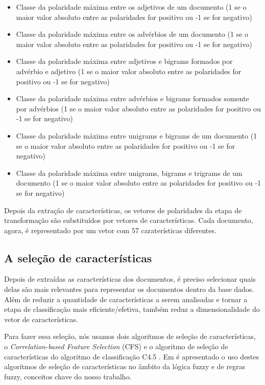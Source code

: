 \begin{itemize}
\item Classe da polaridade máxima entre os adjetivos de um documento (1 se o maior valor absoluto entre as polaridades for positivo ou -1 se for negativo)
\item Classe da polaridade máxima entre os advérbios de um documento (1 se o maior valor absoluto entre as polaridades for positivo ou -1 se for negativo)
\item Classe da polaridade máxima entre adjetivos e bigrams formados por advérbio e adjetivo (1 se o maior valor absoluto entre as polaridades for positivo ou -1 se for negativo)
\item Classe da polaridade máxima entre advérbios e bigrams formados somente por advérbios (1 se o maior valor absoluto entre as polaridades for positivo ou -1 se for negativo)
\item Classe da polaridade máxima entre unigrams e bigrams de um documento (1 se o maior valor absoluto entre as polaridades for positivo ou -1 se for negativo)
\item Classe da polaridade máxima entre unigrams, bigrams e trigrams de um documento (1 se o maior valor absoluto entre as polaridades for positivo ou -1 se for negativo)
\end{itemize}

Depois da extração de características, os vetores de polaridades da etapa de transformação são substituídos por vetores de características. Cada documento, agora, é representado por um vetor com 57 caraterísticas diferentes. 

\subsection{A seleção de características}

Depois de extraídas as características dos documentos, é preciso selecionar quais delas são mais relevantes para representar os documentos dentro da base dados. Além de reduzir a quantidade de características a serem analisadas e tornar a etapa de classificação mais eficiente/efetiva, também reduz a dimensionalidade do vetor de características. 

Para fazer essa seleção, nós usamos dois algoritmos de seleção de características, o \textit{Correlation-based Feature Selection} (CFS) e o algoritmo de seleção de características do algoritmo de classificação C4.5 \cite{cintra2008fuzzy}. Em  é apresentado o uso destes algoritmos de seleção de características no âmbito da lógica fuzzy e de regras fuzzy, conceitos chave do nosso trabalho. 

